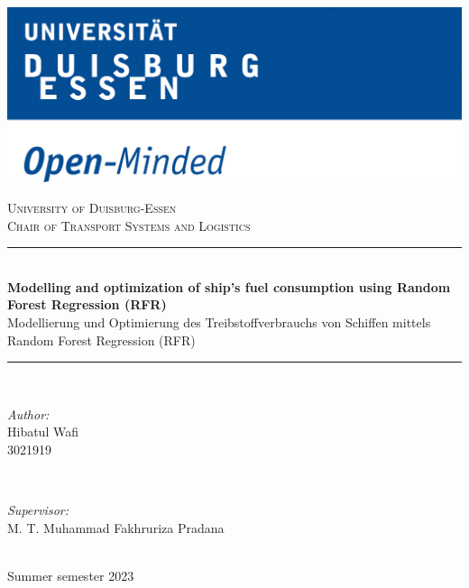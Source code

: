 \thispagestyle{empty}

\newcommand{\HRule}{\rule{\linewidth}{0.5mm}} %

\includegraphics[width=\columnwidth]{02_figures/logo_en.jpg}
\vspace{1cm}

\begin{center} %

\textsc{\LARGE University of Duisburg-Essen}\\[1cm] 
\textsc{\Large Chair of Transport Systems and Logistics}\\[1cm]

\HRule \\[0.4cm]
{\Huge \bfseries Modelling and optimization of ship’s fuel consumption using Random Forest Regression (RFR) }\\[0.5cm] %
{\Large Modellierung und Optimierung des Treibstoffverbrauchs von Schiffen mittels Random Forest Regression (RFR)}
\HRule \\[2cm]


\begin{minipage}{0.4\textwidth}
\begin{flushleft} \large
	\emph{Author:}\\
	Hibatul Wafi\\
    3021919\\
	\end{flushleft}
	\end{minipage}
~
\begin{minipage}{0.4\textwidth}
\begin{flushright} \large
	\emph{Supervisor:} \\
	M. T. Muhammad Fakhruriza Pradana
\end{flushright}
\end{minipage}\\
\vspace{1cm}
\makeatletter
\vspace{1cm}
{\large Summer semester 2023} \\
{\large \@date}
\end{center}
